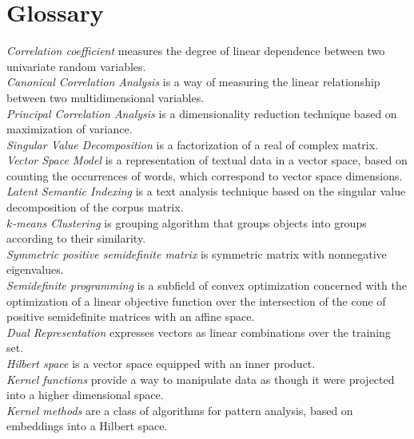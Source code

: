 %
\chapter{Glossary}

\emph{Correlation coefficient} measures the degree of linear dependence between two univariate random variables.\\
\emph{Canonical Correlation Analysis} is a way of measuring the linear relationship between two multidimensional variables.\\
\emph{Principal Correlation Analysis} is a dimensionality reduction technique based on maximization of variance.\\
\emph{Singular Value Decomposition} is a factorization of a real of complex matrix.\\
\emph{Vector Space Model} is a representation of textual data in a vector space, based on counting the occurrences of words, which correspond
to vector space dimensions.\\
\emph{Latent Semantic Indexing} is a text analysis technique based on the singular value decomposition of the corpus matrix.\\
\emph{$k$-means Clustering} is grouping algorithm that groups objects into groups according to their similarity.\\
\emph{Symmetric positive semidefinite matrix} is symmetric matrix with nonnegative eigenvalues.\\
\emph{Semidefinite programming} is a subfield of convex optimization concerned with the optimization of a linear objective function over the intersection of the cone of positive semidefinite matrices with an affine space.\\ 
\emph{Dual Representation} expresses vectors as linear combinations over the training set.\\
\emph{Hilbert space} is a vector space equipped with an inner product.\\
\emph{Kernel functions} provide a way to manipulate data as though it were projected into a higher dimensional space.\\
\emph{Kernel methods} are a class of algorithms for pattern analysis, based on embeddings into a Hilbert space.\\
